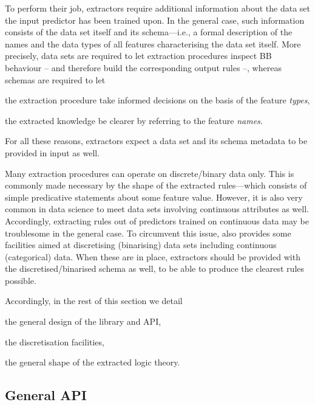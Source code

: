 \documentclass[12pt,a4paper,openright,twoside]{book}
\begin{document}
To perform their job, \psyke{} extractors require additional information about the data set the input predictor has been trained upon.
%
In the general case, such information consists of the data set itself and its schema---i.e., a formal description of the names and the data types of all features characterising the data set itself.
%
More precisely, data sets are required to let extraction procedures inspect BB behaviour -- and therefore build the corresponding output rules --, whereas schemas are required to let
%
\begin{inlinelist}
    \item the extraction procedure take informed decisions on the basis of the feature \emph{types},
    \item the extracted knowledge be clearer by referring to the feature \emph{names}.
\end{inlinelist}
%
For all these reasons, extractors expect a data set and its schema metadata to be provided in input as well.

Many extraction procedures can operate on discrete/binary data only.
%
This is commonly made necessary by the shape of the extracted rules---which consists of simple predicative statements about some feature value.
%
However, it is also very common in data science to meet data sets involving continuous attributes as well.
%
Accordingly, extracting rules out of predictors trained on continuous data may be troublesome in the general case.
%
To circumvent this issue, \psyke{} also provides some facilities aimed at discretising (binarising) data sets including continuous (categorical) data.
%
When these are in place, extractors should be provided with the discretised/binarised schema as well, to be able to produce the clearest rules possible.

Accordingly, in the rest of this section we detail
%
\begin{inlinelist}
    \item the general design of the \psyke{} library and API,
    \item the discretisation facilities,
    \item the general shape of the extracted logic theory.
\end{inlinelist}

\subsection{General API}\label{ssec:general-api}

\end{document}
